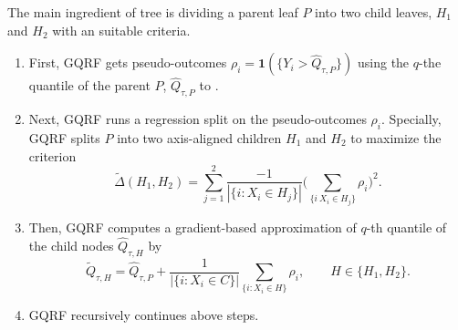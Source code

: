 \documentclass[11pt,titlepage]{article}
\begin{document}
	The main ingredient of tree is dividing a parent leaf $P$ into two child leaves, $H_{1}$ and $H_{2}$ with an suitable criteria. %
%	
	
	
	\begin{enumerate}
		\item First, GQRF gets pseudo-outcomes $\rho_{i}=\mathbf{1}(\{ Y_{i}>\hat{Q}_{\tau,P} \})$ using the $q$-the quantile of the parent $P$, $\hat{Q}_{\tau,P}$ to .
		\item Next, GQRF runs a regression split on the pseudo-outcomes $\rho_{i}$. Specially, GQRF splits $P$ into two axis-aligned children $H_{1}$ and $H_{2}$ to maximize the criterion
		\begin{equation}\label{eq:regressionstep}
		\tilde{\Delta}(H_{1},H_{2})=\sum_{j=1}^{2}\frac{-1}{ | \{ i : X_{i}\in H_{j} \} | }\Big(\sum_{\{ i \: X_{i}\in H_{j} \}}\rho_{i}\Big)^{2}.
		\end{equation}
		\item Then, GQRF computes a gradient-based approximation of $q$-th quantile of the child nodes $\hat{Q}_{\tau, H}$ by
		\begin{equation}\label{eq:gradientapprox}
		\tilde{Q}_{\tau, H}=\hat{Q}_{\tau, P}+\frac{1}{|\{ i: X_{i}\in C \}|}\sum_{\{ i:X_{i}\in H \} }\rho_{i}, \qquad{H \in \{H_{1}, H_{2} \}.}
		\end{equation}
		\item GQRF recursively continues above steps.
	\end{enumerate}
	
\end{document}
